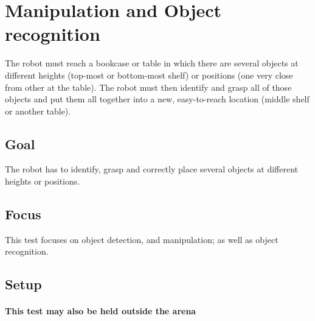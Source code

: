 \section{Manipulation and Object recognition}

The robot must reach a bookcase or table in which there are several objects at different heights (top-most or bottom-most shelf) or positions (one very close from other at the table). The robot must then identify and grasp all of those objects and put them all together into a new, easy-to-reach location (middle shelf or another table).

\subsection{Goal}
The robot has to identify, grasp and correctly place several objects at different heights or positions.


\subsection{Focus}

This test focuses on object detection, and manipulation; as well as object recognition.

\subsection{Setup}
\paragraph{This test may also be held outside the arena}

